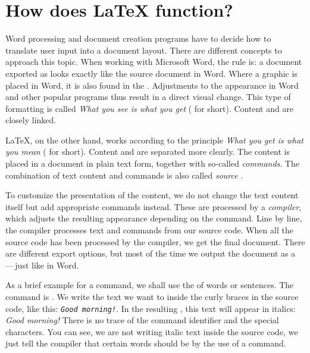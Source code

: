 \chapter{How does \LaTeX{} function?}
\label{sec:basic-functionality}


Word processing and document creation programs have to decide how to translate user input into a document layout.
There are different concepts to approach this topic.
When working with Microsoft Word, the rule is: a document exported as  looks exactly like the source document in Word. 
Where a graphic is placed in Word, it is also found in the . 
Adjustments to the appearance in Word and other popular programs thus result in a direct visual change. 
This type of formatting is called \emph{What you see is what you get} ( for short). 
Content and  are closely linked.

\LaTeX{}, on the other hand, works according to the principle \emph{What you get is what you mean} ( for short). 
Content and  are separated more clearly.
The content is placed in a document in plain text form, together with so-called \emph{commands}. 
The combination of text content and commands is also called \emph{source} .

To customize the presentation of the content, we do not change the text content itself but add appropriate commands instead. 
These are processed by a \emph{compiler}, which adjusts the resulting appearance depending on the command. 
Line by line, the compiler processes text and commands from our source code. 
When all the source code has been processed by the compiler, we get the final document. 
There are different export options, but most of the time we output the document as a \,---\,just like in Word.

As a brief example for a command, we shall use the  of words or sentences. 
The command is \texttt{\emph{}}. 
We write the text we want to  inside the curly braces in the source code, like this: 
\texttt{\emph{Good morning!}}. 
In the resulting , this text will appear in italics: \emph{Good morning!} 
There is no trace of the command identifier and the special characters. 
You can see, we are not writing italic text inside the source code, we just tell the compiler that certain words should be  by the use of a command.

